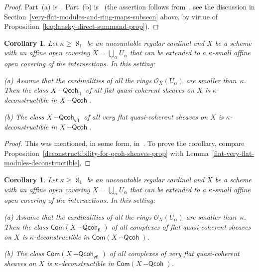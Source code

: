 \documentclass[12pt,a4paper]{amsart}
\newcommand{\+}{\protect\nobreakdash-}
\renewcommand{\:}{\colon}
\newcommand{\Qcoh}{{\operatorname{\mathsf{--Qcoh}}}}
\newcommand{\fl}{\mathsf{fl}}
\newcommand{\vfl}{\mathsf{vfl}}
\newcommand{\Com}{\mathsf{Com}}
\newcommand{\cO}{\mathcal O}
\theoremstyle{plain}
\newtheorem{cor}[thm]{Corollary}
\theoremstyle{definition}
\begin{document}
\begin{proof}
 Part~(a) is~\cite[Lemma~1 and proof of Proposition~2]{BBE}.
 Part~(b) is~\cite[Lemma~2.2]{ST} (the assertion follows
from~\cite[Corollary~1.1.4]{Pcosh}, see the discussion in
Section~\ref{very-flat-modules-and-ring-maps-subsecn} above,
by virtue of Proposition~\ref{kaplansky-direct-summand-prop}).
\end{proof}

\begin{cor} \label{flat-and-very-flat-sheaves-deconstructible}
 Let\/ $\kappa\ge\aleph_1$ be an uncountable regular cardinal and $X$
be a scheme with an affine open covering $X=\bigcup_\alpha U_\alpha$
that can be extended to a\/ $\kappa$\+small affine open covering of
the intersections.
 In this setting: \par
\textup{(a)} Assume that the cardinalities of all the rings\/
$\cO_X(U_\alpha)$ are smaller than\/~$\kappa$.
 Then the class $X\Qcoh_\fl$ of all flat quasi-coherent sheaves on $X$
is\/ $\kappa$\+deconstructible in $X\Qcoh$. \par
\textup{(b)} The class $X\Qcoh_\vfl$ of all very flat quasi-coherent
sheaves on $X$ is\/ $\kappa$\+de\-con\-struct\-ible in $X\Qcoh$.
\end{cor}

\begin{proof}
 This was mentioned, in some form,
in~\cite[proof of Lemma~5.1.1]{Pcosh}.
 To prove the corollary, compare
Proposition~\ref{deconstructibility-for-qcoh-sheaves-prop}
with Lemma~\ref{flat-very-flat-modules-deconstructible}.
\end{proof}

\begin{cor} \label{cmplxs-of-flat-very-flat-sheaves-deconstructible}
 Let\/ $\kappa\ge\aleph_1$ be an uncountable regular cardinal and $X$
be a scheme with an affine open covering $X=\bigcup_\alpha U_\alpha$
that can be extended to a\/ $\kappa$\+small affine open covering of
the intersections.
 In this setting: \par
\textup{(a)} Assume that the cardinalities of all the rings\/
$\cO_X(U_\alpha)$ are smaller than\/~$\kappa$.
 Then the class\/ $\Com(X\Qcoh_\fl)$ of all complexes of flat
quasi-coherent sheaves on $X$ is\/ $\kappa$\+deconstructible in\/
$\Com(X\Qcoh)$. \par
\textup{(b)} The class\/ $\Com(X\Qcoh_\vfl)$ of all complexes of
very flat quasi-coherent sheaves on $X$ is\/ $\kappa$\+deconstructible
in\/ $\Com(X\Qcoh)$.
\end{cor}
\end{document}
